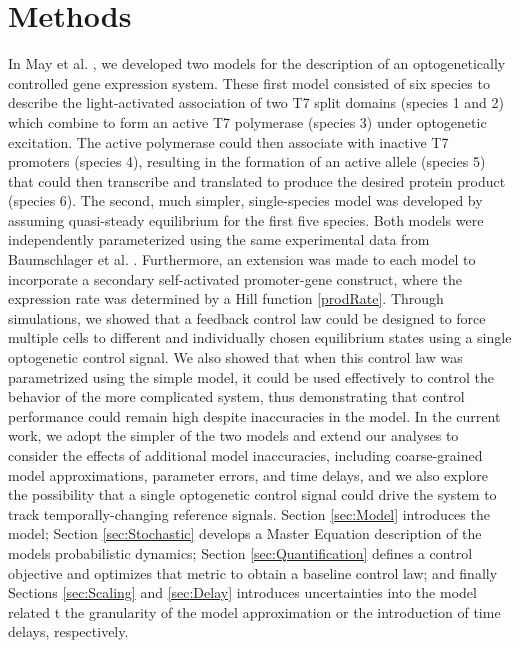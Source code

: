 \documentclass[12pt]{iopart}
\begin{document}
\section{Methods}
In May et al. \cite{May2021}, we developed two models for the description of an optogenetically controlled gene expression system.
These first model consisted of six species to describe the light-activated association of two T7 split domains (species 1 and 2) which combine to form an active T7 polymerase (species 3) under optogenetic excitation. 
The active polymerase could then associate with inactive T7 promoters (species 4), resulting in the formation of an active allele (species 5) that could then transcribe and translated to produce the desired protein product (species 6). 
The second, much simpler, single-species model was developed by assuming quasi-steady equilibrium for the first five species. 
Both models were independently parameterized using the same experimental data from Baumschlager et al. \cite{XXX}. 
Furthermore, an extension was made to each model to incorporate a secondary self-activated promoter-gene construct, where the expression rate was determined by a Hill function \ref{prodRate}.
Through simulations, we showed that a feedback control law could be designed to force multiple cells to different and individually chosen equilibrium states using a single optogenetic control signal. 
We also showed that when this control law was parametrized using the simple model, it could be used effectively to control the behavior of the more complicated system, thus demonstrating that control performance could remain high despite inaccuracies in the model.
In the current work, we adopt the simpler of the two models and extend our analyses to consider the effects of additional model inaccuracies, including coarse-grained model approximations, parameter errors, and time delays, and we also explore the possibility that a single optogenetic control signal could drive the system to track temporally-changing reference signals.
Section \ref{sec:Model} introduces the model; Section \ref{sec:Stochastic} develops a Master Equation description of the models probabilistic dynamics; Section \ref{sec:Quantification} defines a control objective and optimizes that metric to obtain a baseline control law; and finally Sections \ref{sec:Scaling} and \ref{sec:Delay} introduces uncertainties into the model related t the granularity of the model approximation or the introduction of time delays, respectively. 
\end{document}
